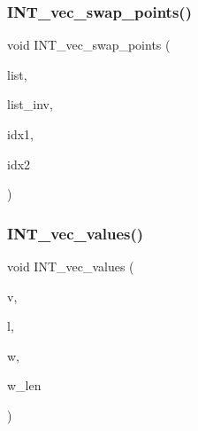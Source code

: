 \mbox{\label{sorting_8_c_ab7fe4718a7a2f2c8ceb6ce44e4d6ac4e}} 
\subsubsection{\texorpdfstring{I\+N\+T\+\_\+vec\+\_\+swap\+\_\+points()}{INT\_vec\_swap\_points()}}
{\footnotesize\ttfamily void I\+N\+T\+\_\+vec\+\_\+swap\+\_\+points (\begin{DoxyParamCaption}\item[{\mbox{\hyperlink{galois_8h_a09fddde158a3a20bd2dcadb609de11dc}{I\+NT}} $\ast$}]{list,  }\item[{\mbox{\hyperlink{galois_8h_a09fddde158a3a20bd2dcadb609de11dc}{I\+NT}} $\ast$}]{list\+\_\+inv,  }\item[{\mbox{\hyperlink{galois_8h_a09fddde158a3a20bd2dcadb609de11dc}{I\+NT}}}]{idx1,  }\item[{\mbox{\hyperlink{galois_8h_a09fddde158a3a20bd2dcadb609de11dc}{I\+NT}}}]{idx2 }\end{DoxyParamCaption})}

\mbox{\label{sorting_8_c_aff1e6f8aaeb5019a38e7ac220ec5e35c}} 
\subsubsection{\texorpdfstring{I\+N\+T\+\_\+vec\+\_\+values()}{INT\_vec\_values()}}
{\footnotesize\ttfamily void I\+N\+T\+\_\+vec\+\_\+values (\begin{DoxyParamCaption}\item[{\mbox{\hyperlink{galois_8h_a09fddde158a3a20bd2dcadb609de11dc}{I\+NT}} $\ast$}]{v,  }\item[{\mbox{\hyperlink{galois_8h_a09fddde158a3a20bd2dcadb609de11dc}{I\+NT}}}]{l,  }\item[{\mbox{\hyperlink{galois_8h_a09fddde158a3a20bd2dcadb609de11dc}{I\+NT}} $\ast$\&}]{w,  }\item[{\mbox{\hyperlink{galois_8h_a09fddde158a3a20bd2dcadb609de11dc}{I\+NT}} \&}]{w\+\_\+len }\end{DoxyParamCaption})}

